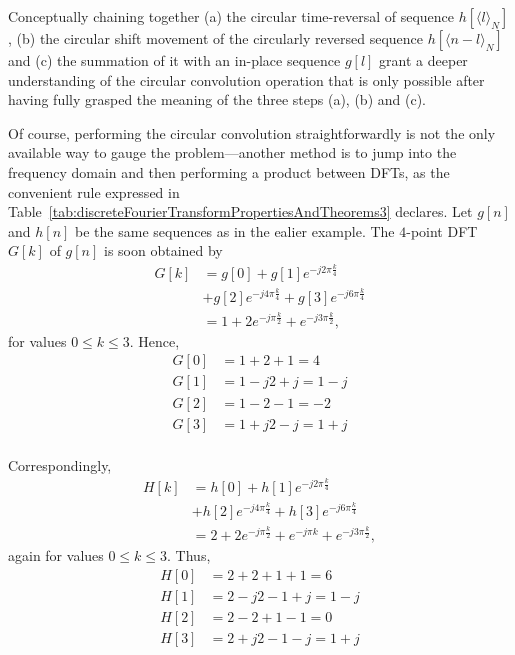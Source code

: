 \documentclass[\documentfontsize, twocolumn]{\classname}
\begin{document}
Conceptually chaining together (a) the circular time-reversal of sequence $h[\langle l\rangle_N]$, (b) the circular shift movement of the circularly reversed sequence $h[\langle n-l\rangle_N]$ and (c) the summation of it with an in-place sequence $g[l]$ grant a deeper understanding of the circular convolution operation that is only possible after having fully grasped the meaning of the three steps (a), (b) and (c).

Of course, performing the circular convolution straightforwardly is not the only available way to gauge the problem---another method is to jump into the frequency domain and then performing a product between DFTs, as the convenient rule expressed in Table~\ref{tab:discreteFourierTransformPropertiesAndTheorems3} declares. Let $g[n]$ and $h[n]$ be the same sequences as in the ealier example. The $4$-point DFT $G[k]$ of $g[n]$ is soon obtained by
\begin{align*}
    G[k] &= g[0] + g[1] e^{-j2\pi \frac k 4} \\
         &+ g[2]e^{-j4\pi \frac k 4} + g[3] e^{-j6\pi \frac k 4}\\
         &= 1 + 2e^{-j\pi \frac k 2} + e^{-j3\pi \frac k 2},
\end{align*}
for values $0 \leq k \leq 3$. Hence,
\begin{align*}
    G[0] &= 1 + 2 + 1 = 4\\
    G[1] &= 1 - j2 + j = 1 - j\\
    G[2] &= 1 - 2 - 1 = -2\\
    G[3] &= 1 + j2 - j = 1 + j\\
\end{align*}

Correspondingly,
\begin{align*}
    H[k] &= h[0] + h[1] e^{-j2\pi \frac k 4} \\
         &+ h[2]e^{-j4\pi \frac k 4} + h[3] e^{-j6\pi \frac k 4}\\
         &= 2 + 2e^{-j\pi \frac k 2} + e^{-j\pi k} + e^{-j3\pi \frac k 2},
\end{align*}
again for values $0 \leq k \leq 3$. Thus,
\begin{align*}
    H[0] &= 2 + 2 + 1 + 1 = 6\\
    H[1] &= 2 - j2 - 1 + j = 1 - j\\
    H[2] &= 2 - 2 + 1 - 1 = 0\\
    H[3] &= 2 + j2 - 1 - j = 1 + j\\
\end{align*}
\end{document}
